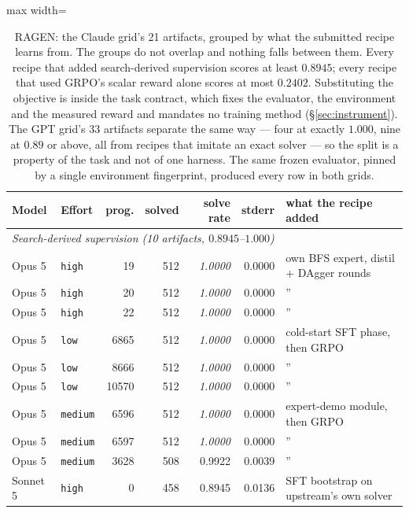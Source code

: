 \begin{table}[t]
\centering
\caption{RAGEN: the Claude grid's 21 artifacts, grouped by what the submitted recipe learns
from. The groups do not overlap and nothing falls between them. Every recipe that added
search-derived supervision scores at least $0.8945$; every recipe that used GRPO's scalar
reward alone scores at most $0.2402$. Substituting the objective is inside the task contract,
which fixes the evaluator, the environment and the measured reward and mandates no training
method (\S\ref{sec:instrument}). The GPT grid's 33 artifacts separate the same way --- four at
exactly $1.000$, nine at $0.89$ or above, all from recipes that imitate an exact solver ---
so the split is a property of the task and not of one harness. The same frozen evaluator, pinned by a single environment
fingerprint, produced every row in both grids.}
\label{tab:ragen}
\small
\begin{adjustbox}{max width=\linewidth}
\begin{tabular}{llrrrrl}
\toprule
\textbf{Model} & \textbf{Effort} & \textbf{prog.} & \textbf{solved} & \textbf{solve rate} & \textbf{stderr} & \textbf{what the recipe added} \\
\midrule
\multicolumn{7}{l}{\emph{Search-derived supervision (10 artifacts, $0.8945$--$1.000$)}} \\
Opus 5   & \texttt{high}   &    19 & 512 & \emph{1.0000} & 0.0000 & own BFS expert, distil + DAgger rounds \\
Opus 5   & \texttt{high}   &    20 & 512 & \emph{1.0000} & 0.0000 & \quad'' \\
Opus 5   & \texttt{high}   &    22 & 512 & \emph{1.0000} & 0.0000 & \quad'' \\
Opus 5   & \texttt{low}    &  6865 & 512 & \emph{1.0000} & 0.0000 & cold-start SFT phase, then GRPO \\
Opus 5   & \texttt{low}    &  8666 & 512 & \emph{1.0000} & 0.0000 & \quad'' \\
Opus 5   & \texttt{low}    & 10570 & 512 & \emph{1.0000} & 0.0000 & \quad'' \\
Opus 5   & \texttt{medium} &  6596 & 512 & \emph{1.0000} & 0.0000 & expert-demo module, then GRPO \\
Opus 5   & \texttt{medium} &  6597 & 512 & \emph{1.0000} & 0.0000 & \quad'' \\
Opus 5   & \texttt{medium} &  3628 & 508 & 0.9922 & 0.0039 & \quad'' \\
Sonnet 5 & \texttt{high}   &     0 & 458 & 0.8945 & 0.0136 & SFT bootstrap on upstream's own solver \\

\end{tabular}
\end{adjustbox}
\end{table}
